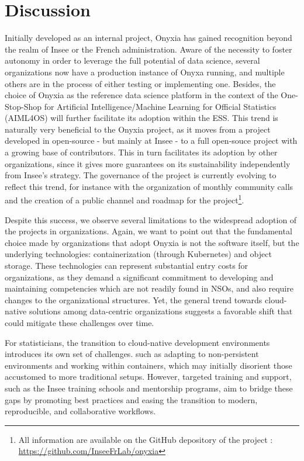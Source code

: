 \section{Discussion}

Initially developed as an internal project, Onyxia has gained recognition beyond the realm of Insee or the French administration. Aware of the necessity to foster autonomy in order to leverage the full potential of data science, several organizations now have a production instance of Onyxa running, and multiple others are in the process of either testing or implementing one. Besides, the choice of Onyxia as the reference data science platform in the context of the One-Stop-Shop for Artificial Intelligence/Machine Learning for Official Statistics (AIML4OS) will further facilitate its adoption within the ESS. This trend is naturally very beneficial to the Onyxia project, as it moves from a project developed in open-source - but mainly at Insee - to a full open-souce project with a growing base of contributors. This in turn facilitates its adoption by other organizations, since it gives more guarantees on its sustainability independently from Insee's strategy. The governance of the project is currently evolving to reflect this trend, for instance with the organization of monthly community calls and the creation of a public channel and roadmap for the project\footnote{All information are available on the GitHub depository of the project : \url{https://github.com/InseeFrLab/onyxia}}.

Despite this success, we observe several limitations to the widespread adoption of the projects in organizations. Again, we want to point out that the fundamental choice made by organizations that adopt Onyxia is not the software itself, but the underlying technologies: containerization (through Kubernetes) and object storage. These technologies can represent substantial entry costs for organizations, as they demand a significant commitment to developing and maintaining competencies which are not readily found in NSOs, and also require changes to the organizational structures. Yet, the general trend towards cloud-native solutions among data-centric organizations suggests a favorable shift that could mitigate these challenges over time.

For statisticians, the transition to cloud-native development environments introduces its own set of challenges. such as adapting to non-persistent environments and working within containers, which may initially disorient those accustomed to more traditional setups. However, targeted training and support, such as the Insee training schools and mentorship programs, aim to bridge these gaps by promoting best practices and easing the transition to modern, reproducible, and collaborative workflows.

